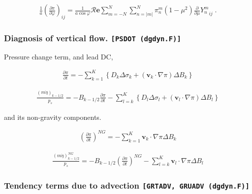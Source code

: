 \begin{eqnarray}
   \frac{1}{a}
   \left( \frac{\partial \pi}{\partial \varphi} \right)_{ij}
     =  
   \frac{1}{a \cos \varphi}
       {\mathcal R}{\mathbf{e}} \sum_{m=-N}^{N} \sum_{n=|m|}^{N}
       \pi_n^m
       ( 1-\mu^{2} ) \frac{\partial }{\partial \mu} {Y_n^m}_{ij}  \; .
\end{eqnarray}

\hypertarget{diagnosis-of-vertical-flow.-psdot-dgdyn.f}{%
\subsubsection{\texorpdfstring{Diagnosis of vertical flow.
\texttt{{[}PSDOT\ (dgdyn.F){]}}}{Diagnosis of vertical flow. {[}PSDOT (dgdyn.F){]}}}\label{diagnosis-of-vertical-flow.-psdot-dgdyn.f}}

Pressure change term, and lead DC,

\begin{eqnarray}
  \frac{\partial \pi}{\partial t}
   = - \sum_{k=1}^{K} \left\{ D_k \Delta\sigma_k + ({\mathbf{v}}_k \cdot \nabla \pi)\Delta B_k \right\}
\end{eqnarray}

\begin{eqnarray}
  \frac{(m\dot{\eta})_{k-1/2}}{p_s}
   = - B_{k-1/2} \frac{\partial \pi}{\partial t}
    - \sum_{l=k}^{K}\left\{ D_l \Delta\sigma_l + ({\mathbf{v}}_l \cdot \nabla \pi)\Delta B_l \right\}
\end{eqnarray}

and its non-gravity components.

\begin{eqnarray}
  \left( \frac{\partial \pi}{\partial t} \right)^{NG}
   =   - \sum_{k=1}^{K} {\mathbf{v}}_{k} \cdot \nabla \pi  
       \Delta B_{k}
\end{eqnarray}

\begin{eqnarray}
  \frac{(m\dot{\eta})^{NG}_{k-1/2}}{p_s}
   = - B_{k-1/2} \left( \frac{\partial \pi}{\partial t} \right)^{NG}
    - \sum_{l=k}^{K} {\mathbf{v}}_{l} \cdot \nabla \pi
       \Delta B_{l}
\end{eqnarray}

\hypertarget{tendency-terms-due-to-advection-grtadv-gruadv-dgdyn.f}{%
\subsubsection{\texorpdfstring{Tendency terms due to advection
\texttt{{[}GRTADV,\ GRUADV\ (dgdyn.F){]}}}{Tendency terms due to advection {[}GRTADV, GRUADV (dgdyn.F){]}}}\label{tendency-terms-due-to-advection-grtadv-gruadv-dgdyn.f}}


